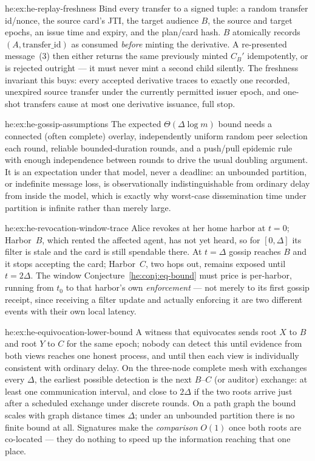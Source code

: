 \begin{pdSolution}{he:ex:he-replay-freshness}
Bind every transfer to a signed tuple: a random transfer id/nonce, the
source card's JTI, the target audience $B$, the source and target epochs, an
issue time and expiry, and the plan/card hash. $B$ atomically records
$(A,\text{transfer\_id})$ as consumed \emph{before} minting the derivative. A
re-presented message~(3) then either returns the same previously minted $C_B'$
idempotently, or is rejected outright --- it must never mint a second child
silently. The freshness invariant this buys: every accepted derivative traces to
exactly one recorded, unexpired source transfer under the currently permitted
issuer epoch, and one-shot transfers cause at most one derivative issuance, full
stop.
\end{pdSolution}
\begin{pdSolution}{he:ex:he-gossip-assumptions}
The expected $\Theta(\Delta\log m)$ bound needs a connected (often complete)
overlay, independently uniform random peer selection each round, reliable
bounded-duration rounds, and a push/pull epidemic rule with enough independence
between rounds to drive the usual doubling argument. It is an expectation under
that model, never a deadline: an unbounded partition, or indefinite message
loss, is observationally indistinguishable from ordinary delay from inside the
model, which is exactly why worst-case dissemination time under partition is
infinite rather than merely large.
\end{pdSolution}
\begin{pdSolution}{he:ex:he-revocation-window-trace}
Alice revokes at her home harbor at $t=0$; Harbor~$B$, which rented the
affected agent, has not yet heard, so for $[0,\Delta]$ its filter is stale and
the card is still spendable there. At $t=\Delta$ gossip reaches $B$ and it stops
accepting the card; Harbor~$C$, two hops out, remains exposed until $t=2\Delta$.
The window Conjecture~\ref{he:conj:eq-bound} must price is per-harbor, running from
$t_0$ to that harbor's own \emph{enforcement} --- not merely to its first gossip
receipt, since receiving a filter update and actually enforcing it are two
different events with their own local latency.
\end{pdSolution}
\begin{pdSolution}{he:ex:he-equivocation-lower-bound}
A witness that equivocates sends root $X$ to $B$ and root $Y$ to $C$ for the
same epoch; nobody can detect this until evidence from both views reaches one
honest process, and until then each view is individually consistent with
ordinary delay. On the three-node complete mesh with exchanges every $\Delta$,
the earliest possible detection is the next $B$--$C$ (or auditor) exchange: at
least one communication interval, and close to $2\Delta$ if the two roots arrive
just after a scheduled exchange under discrete rounds. On a path graph the bound
scales with graph distance times $\Delta$; under an unbounded partition there is
no finite bound at all. Signatures make the \emph{comparison} $O(1)$ once both
roots are co-located --- they do nothing to speed up the information reaching
that one place.
\end{pdSolution}
